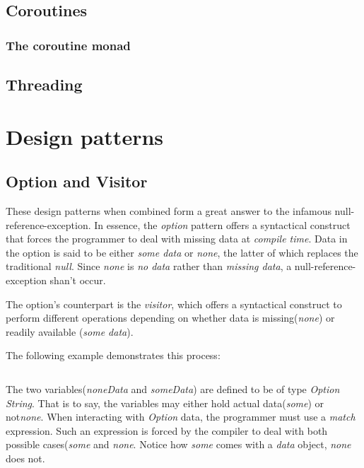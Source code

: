 \documentclass{article}
\begin{document}
\subsection{Coroutines}
\subsubsection{The coroutine monad}
\subsection{Threading}

\newpage

\section{Design patterns}

\subsection{Option and Visitor}
These design patterns when combined form a great answer to the infamous null-reference-exception.
In essence, the {\em option} pattern offers a syntactical construct that forces the programmer to deal with missing data at {\em compile time}.
Data in the option is said to be either {\em some data} or {\em none}, the latter of which replaces the traditional {\em null}.
Since {\em none} is {\em no data} rather than {\em missing data}, a null-reference-exception shan't occur.

The option's counterpart is the {\em visitor}, which offers a syntactical construct to perform different operations depending on whether data
is missing({\em none}) or readily available ({\em some data}).

The following example demonstrates this process:

\begin{lstlisting}[language=Python]
\end{lstlisting}

The two variables({\em noneData} and {\em someData}) are defined to be of type {\em Option String}.
That is to say, the variables may either hold actual data({\em some}) or not{\em none}.
When interacting with {\em Option} data, the programmer must use a {\em match} expression.
Such an expression is forced by the compiler to deal with both possible cases({\em some} and {\em none}.
Notice how {\em some} comes with a {\em data} object, {\em none} does not.
\end{document}
